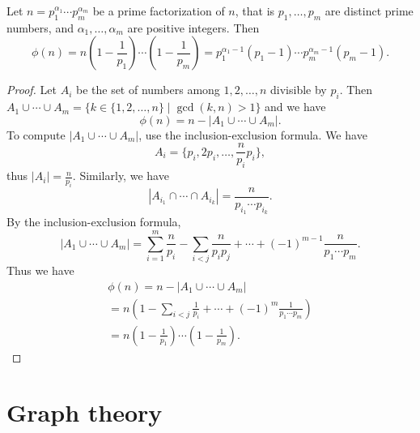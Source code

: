 \begin{page}
\setcounter{section}{5}
\setcounter{subsection}{3}
\setcounter{dfn}{4}
\label{portion:164}

\begin{thm}
Let $n = p_1^{\alpha_1} \cdots p_m^{\alpha_m}$ be a prime factorization of $n$, that is
$p_1, \ldots, p_m$ are distinct prime numbers, and $\alpha_1, \ldots, \alpha_m$ are positive integers.
Then
\[
\phi(n) = n\left(1-\frac{1}{p_1}\right) \cdots \left(1-\frac{1}{p_m}\right)
= p_1^{\alpha_1-1}(p_1-1) \cdots p_m^{\alpha_m-1}(p_m-1).
\]
\end{thm}

\end{page}

\begin{page}
\setcounter{section}{0}
\setcounter{subsection}{0}
\setcounter{dfn}{4}
\label{portion:165}

\begin{proof}
Let $A_i$ be the set of numbers among $1, 2, \ldots, n$ divisible by $p_i$.
Then $A_1 \cup \cdots \cup A_m = \{k \in \{1, 2, \ldots, n\} \mid \gcd(k,n) > 1\}$ and we have
\[
\phi(n) = n - |A_1 \cup \cdots \cup A_m|.
\]
To compute $|A_1 \cup \cdots \cup A_m|$, use the inclusion-exclusion formula.
We have
\[
A_i = \{p_i, 2p_i, \ldots, \frac{n}{p_i} p_i\},
\]
thus $|A_i| = \frac{n}{p_i}$.
Similarly, we have
\[
|A_{i_1} \cap \cdots \cap A_{i_k}| = \frac{n}{p_{i_1} \cdots p_{i_k}}.
\]
By the inclusion-exclusion formula,
\[
|A_1 \cup \cdots \cup A_m| = \sum_{i=1}^m \frac{n}{p_i} - \sum_{i<j} \frac{n}{p_ip_j} + \cdots + (-1)^{m-1} \frac{n}{p_1\cdots p_m}.
\]
Thus we have
\begin{multline*}
\phi(n) = n - |A_1 \cup \cdots \cup A_m|\\
= n \left( 1 - \sum_{i<j} \frac{1}{p_i} + \cdots + (-1)^m \frac{1}{p_1 \cdots p_m} \right)\\
= n \left(1-\frac{1}{p_1}\right) \cdots \left(1-\frac{1}{p_m}\right).
\end{multline*}


\end{proof}





\end{page}

\begin{page}
\setcounter{section}{1}
\setcounter{subsection}{0}
\setcounter{dfn}{4}
\label{portion:167}

\chapter{Graph theory}

\end{page}

